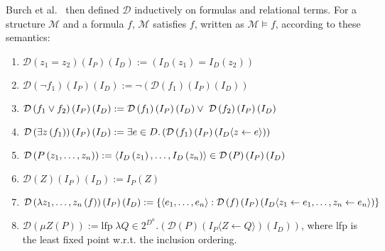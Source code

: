 \documentclass{vldb}
\begin{document}
Burch et al.~\cite{BURCH90} then defined $\mathcal{D}$ inductively on formulas
and relational terms. For a structure $\mathcal{M}$ and a formula $f$,
$\mathcal{M}$ satisfies $f$, written as $\mathcal{M} \models f$, according to
these semantics:
\begin{enumerate}
    \item{
        $\mathcal{D} \left( z_1 = z_2 \right) \left( I_P \right) \left( I_D \right) :=
        \left( I_D \left( z_1 \right) = I_D \left( z_2 \right) \right)$
    }
    \item{
        $\mathcal{D} \left( \neg f_1 \right) \left( I_P \right) \left( I_D \right) :=
        \neg \left( \mathcal{D} \left( f_1 \right) \left( I_P \right) \left( I_D \right) \right)$
    }
    \item{
        $\mathcal{D} \left( f_1 \lor f_2 \right) \left( I_P \right) \left( I_D \right) := \newline
        \mathcal{D} \left( f_1 \right) \left( I_P \right) \left( I_D \right) \lor\;\mathcal{D} \left( f_2 \right) \left( I_P \right) \left( I_D \right)$
    }
    \item{
        $\mathcal{D} \left( \exists z \left( f_1 \right) \right) \left( I_P \right) \left( I_D \right) := \newline
        \exists e \in D . \left( \mathcal{D} \left( f_1 \right) \left( I_P \right) \left( I_D \langle z \leftarrow e \rangle \right) \right)$
    }
    \item{
        $\mathcal{D} \left( P\left( z_1, \ldots, z_n \right) \right) := \newline
        \langle I_D \left( z_1 \right), \ldots, I_D \left( z_n \right) \rangle \in \mathcal{D} \left( P \right) \left( I_P \right) \left( I_D \right)$
    }
    \item{
        $\mathcal{D} \left( Z \right) \left( I_P \right) \left( I_D \right) :=
        I_P \left( Z \right)$
    }
    \item{
        $\mathcal{D} \left( \lambda z_1, \ldots, z_n \left( f \right) \right) \left( I_P \right) \left( I_D \right) := \newline
        \lbrace \langle e_1, \ldots, e_n \rangle : \mathcal{D} \left( f \right) \left( I_P \right) \left( I_D \langle z_1 \leftarrow e_1, \ldots, z_n \leftarrow e_n \rangle \right) \rbrace$
    }
    \item{
        $\mathcal{D} \left( \mu Z \left( P \right) \right) :=
        \text{lfp}\;\lambda Q \in 2^{D^n} . \left( \mathcal{D} \left( P \right) \left( I_P \langle Z \leftarrow Q \rangle \right) \left( I_D \right) \right)$,
        where lfp is the least fixed point w.r.t. the inclusion ordering.
    }
\end{enumerate}
\end{document}
